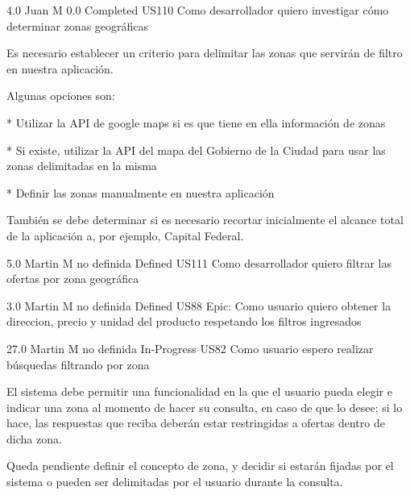 		{4.0} %
		{Juan M} %
		{0.0} %
		{Completed} %
\userStory
	{US110} %
	{Como desarrollador quiero investigar cómo determinar zonas geográficas} %
	{Es necesario establecer un criterio para delimitar las zonas que servirán de
filtro en nuestra aplicación.

Algunas opciones son:

  

* Utilizar la API de google maps si es que tiene en ella información de zonas

* Si existe, utilizar la API del mapa del Gobierno de la Ciudad para usar las zonas delimitadas en la misma

* Definir las zonas manualmente en nuestra aplicación

  

También se debe determinar si es necesario recortar inicialmente el alcance
total de la aplicación a, por ejemplo, Capital Federal.

  

} %
	{} %
	{5.0} %
	{Martin M} %
	{no definida} %
	{Defined} %
\userStory
	{US111} %
	{Como desarrollador quiero filtrar las ofertas por zona geográfica} %
	{

} %
	{} %
	{3.0} %
	{Martin M} %
	{no definida} %
	{Defined} %
\userStory
	{US88} %
	{Epic: Como usuario quiero obtener la direccion, precio y unidad del producto respetando los filtros ingresados} %
	{

} %
	{} %
	{27.0} %
	{Martin M} %
	{no definida} %
	{In-Progress} %
\userStory
	{US82} %
	{Como usuario espero realizar búsquedas filtrando por zona} %
	{El sistema debe permitir una funcionalidad en la que el usuario pueda elegir e
indicar una zona al momento de hacer su consulta, en caso de que lo desee; si
lo hace, las respuestas que reciba deberán estar restringidas a ofertas dentro
de dicha zona.

  

Queda pendiente definir el concepto de zona, y decidir si estarán fijadas por
el sistema o pueden ser delimitadas por el usuario durante la consulta.

} %
